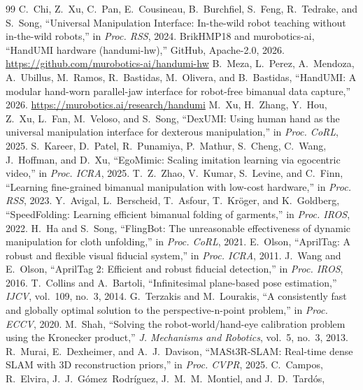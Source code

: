 \documentclass[conference,10pt]{IEEEtran}
\begin{document}
\begin{thebibliography}{99}
\footnotesize
{} C.~Chi, Z.~Xu, C.~Pan, E.~Cousineau, B.~Burchfiel, S.~Feng, R.~Tedrake, and S.~Song, ``Universal
Manipulation Interface: In-the-wild robot teaching without in-the-wild robots,'' in \emph{Proc. RSS}, 2024.
 BrikHMP18 and murobotics-ai, ``HandUMI hardware (handumi-hw),'' GitHub, Apache-2.0, 2026.
\url{https://github.com/murobotics-ai/handumi-hw}
 B.~Meza, L.~Perez, A.~Mendoza, A.~Ubillus, M.~Ramos, R.~Bastidas, M.~Olivera, and B.~Bastidas,
``HandUMI: A modular hand-worn parallel-jaw interface for robot-free bimanual data capture,'' 2026.
\url{https://murobotics.ai/research/handumi}
 M.~Xu, H.~Zhang, Y.~Hou, Z.~Xu, L.~Fan, M.~Veloso, and S.~Song, ``DexUMI: Using human hand as the
universal manipulation interface for dexterous manipulation,'' in \emph{Proc. CoRL}, 2025.
 S.~Kareer, D.~Patel, R.~Punamiya, P.~Mathur, S.~Cheng, C.~Wang, J.~Hoffman, and D.~Xu,
``EgoMimic: Scaling imitation learning via egocentric video,'' in \emph{Proc. ICRA}, 2025.
 T.~Z.~Zhao, V.~Kumar, S.~Levine, and C.~Finn, ``Learning fine-grained bimanual manipulation with
low-cost hardware,'' in \emph{Proc. RSS}, 2023.
 Y.~Avigal, L.~Berscheid, T.~Asfour, T.~Kr\"oger, and K.~Goldberg, ``SpeedFolding: Learning
efficient bimanual folding of garments,'' in \emph{Proc. IROS}, 2022.
 H.~Ha and S.~Song, ``FlingBot: The unreasonable effectiveness of dynamic manipulation for cloth
unfolding,'' in \emph{Proc. CoRL}, 2021.
 E.~Olson, ``AprilTag: A robust and flexible visual fiducial system,'' in \emph{Proc. ICRA},
2011.
 J.~Wang and E.~Olson, ``AprilTag 2: Efficient and robust fiducial detection,'' in
\emph{Proc. IROS}, 2016.
 T.~Collins and A.~Bartoli, ``Infinitesimal plane-based pose estimation,'' \emph{IJCV}, vol.~109,
no.~3, 2014.
 G.~Terzakis and M.~Lourakis, ``A consistently fast and globally optimal solution to the
perspective-n-point problem,'' in \emph{Proc. ECCV}, 2020.
 M.~Shah, ``Solving the robot-world/hand-eye calibration problem using the Kronecker
product,'' \emph{J. Mechanisms and Robotics}, vol.~5, no.~3, 2013.
 R.~Murai, E.~Dexheimer, and A.~J.~Davison, ``MASt3R-SLAM: Real-time dense SLAM with 3D
reconstruction priors,'' in \emph{Proc. CVPR}, 2025.
 C.~Campos, R.~Elvira, J.~J.~G\'omez~Rodr\'iguez, J.~M.~M.~Montiel, and J.~D.~Tard\'os,

\end{thebibliography}
\end{document}

